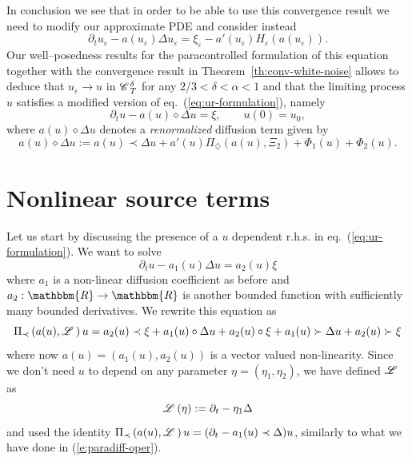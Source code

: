 \documentclass[11pt,reqno]{amsart}
\newcommand{\assign}{:=}
\newcommand{\tmtextit}[1]{{\itshape{#1}}}
\newcommand{\CC}{\mathscr{C} \hspace{.1em}}
\newcommand{\LL}{\mathscr{L} \hspace{.2em}}
\begin{document}
In conclusion we see that in order to be able to use this convergence result
we need to modify our approximate PDE and consider instead
\[ \partial_t u_{\varepsilon} - a (u_{\varepsilon}) \Delta u_{\varepsilon} =
   \xi_{\varepsilon} - a' (u_{\varepsilon}) H_{\varepsilon} (a
   (u_{\varepsilon})) . \]
Our well--posedness results for the paracontrolled formulation of this
equation together with the convergence result in
Theorem~\ref{th:conv-white-noise} allows to deduce that $u_{\varepsilon}
\rightarrow u$ in $\CC^{\delta}_T$ for any $2 / 3 < \delta < \alpha < 1$ and
that the limiting process $u$ satisfies a modified version of
eq.~(\ref{eq:ur-formulation}), namely
\[ \partial_t u - a (u) \diamond \Delta u = \xi, \qquad u (0) = u_0, \]
where $a (u) \diamond \Delta u$ denotes a \tmtextit{renormalized} diffusion
term given by
\begin{equation}
  a (u) \diamond \Delta u \assign a (u) \prec \Delta u + a' (u)
  \Pi_{\diamondsuit} (a (u), \Xi_2) + \Phi_1 (u) + \Phi_2 (u) .
  \label{eq:ren-diff}
\end{equation}
\section{Nonlinear source terms}\label{sec:gen-nonlinear}

Let us start by discussing the presence of a $u$ dependent r.h.s. in
eq.~(\ref{eq:ur-formulation}). We want to solve
\[ \partial_t u - a_1 (u) \Delta u = a_2 (u) \xi \]
where $a_1$ is a non-linear diffusion coefficient as before and $a_2 :
\mathbbm{R} \rightarrow \mathbbm{R}$ is another bounded function with
sufficiently many bounded derivatives. We rewrite this equation as
\[ \Pi_{\prec} \left( a (u), \LL \right) u = a_2 (u) \prec \xi + a_1 (u) \circ
   \Delta u + a_2 (u) \circ \xi + a_1 (u) \succ \Delta u + a_2 (u) \succ \xi
\]
where now $a (u) = (a_1 (u), a_2 (u))$ is a vector valued non-linearity. Since
we don't need $u$ to depend on any parameter $\eta = (\eta_1, \eta_2)$, we
have defined $\LL$ as
\[ \LL (\eta) \assign \partial_t - \eta_1 \Delta \]
and used the identity $\Pi_{\prec} \left( a (u), \LL \right) u = (\partial_t -
a_1 (u) \prec \Delta) u$, similarly to what we have done in
(\ref{e:paradiff-oper}).
\end{document}
